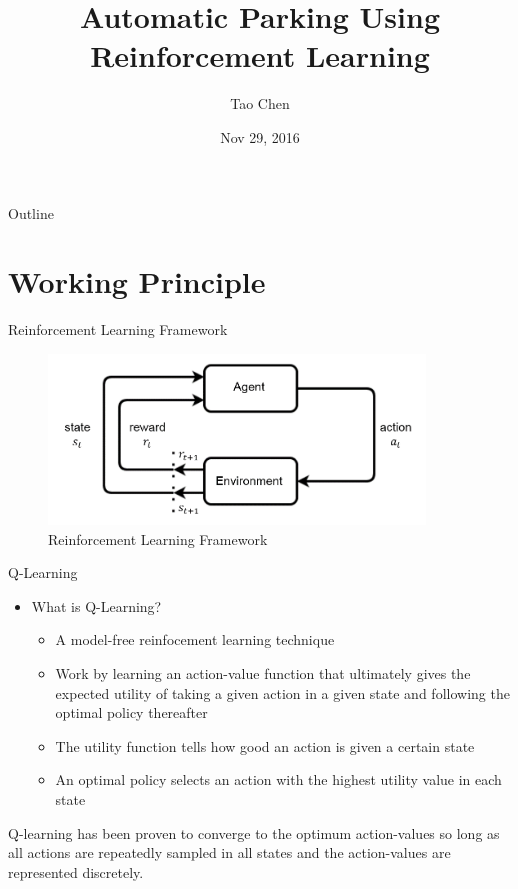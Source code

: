\documentclass{beamer}
\title{Automatic Parking Using Reinforcement Learning}
\author{Tao Chen}
\institute[Shanghai Lingxian]
{
  Shanghai LingXian Robotics
}
\date{Nov 29, 2016}
\begin{document}
\begin{frame}
  \titlepage
\end{frame}

\begin{frame}{Outline}
  \tableofcontents
\end{frame}

\section{Working Principle}

\begin{frame}{Reinforcement Learning Framework}
\begin{figure}
    \centering
    \includegraphics[width=10cm]{agent_env.png}
    \caption{Reinforcement Learning Framework}
    \label{fig:Reinforcement Learning Framework}
\end{figure}    
\end{frame}


\begin{frame}{Q-Learning}
\begin{itemize}
\item{What is Q-Learning?}
\begin{itemize}
\item{A model-free reinfocement learning technique}
\item{Work by learning an {\color{blue}action-value function} that ultimately gives the {\color{blue}expected utility} of taking a given action in a given state and following the optimal policy thereafter}
\item{The utility function tells how good an action is given a certain state}
\item{An optimal policy selects an action with the highest utility value in each state}
\end{itemize}
\end{itemize}
Q-learning has been proven to {\color{blue}converge} to the {\color{blue}optimum action-values} so long as all actions are repeatedly sampled in all states and the action-values are represented discretely.
\end{frame}
\end{document}
